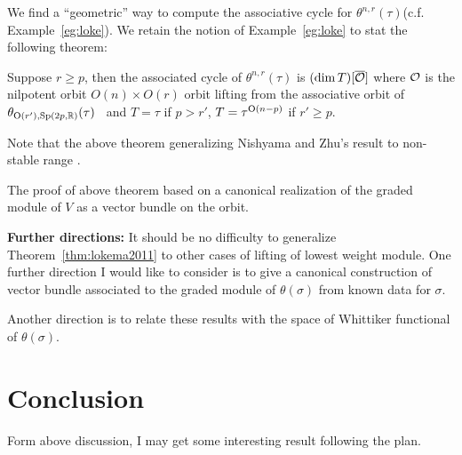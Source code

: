 \documentclass{amsart}
\begin{document}
We find a ``geometric'' way to compute the associative cycle for $\theta^{n,r}(\tau)$(c.f. Example~\ref{eg:loke}).
We retain the notion of Example~\ref{eg:loke} to stat the following theorem:
\begin{thm} \label{thm:lokema2011}
Suppose $r\geq p$, then the associated cycle of $\theta^{n,r}(\tau)$ is 
$(\dim T)[\overline{\mathcal{O}}]$ where $\mathcal{O}$ is the nilpotent orbit $O(n)\times O(r)$ orbit lifting from the associative
orbit of $\theta_{{\rm O}(r'),{\rm Sp}(2p,{\mathbb{R}})}(\tau)$~\cite{NishyamaZhu2004} 
and $T= \tau$ if $p>r'$, $T=\tau^{{\rm O}(n-p)}$ if $r'\geq p$.  
\end{thm}
Note that the above theorem generalizing Nishyama and Zhu's result to non-stable range \cite{NishyamaZhu2004}.

The proof of above theorem based on a canonical realization of the graded module of $V$ as a vector bundle on the orbit. 

{\bf Further directions:} It should be no difficulty to generalize Theorem~\ref{thm:lokema2011}
to other cases of lifting of lowest weight module. One further direction I would like to consider
is to give a canonical construction of vector bundle associated to
the graded module of $\theta(\sigma)$ from known data for $\sigma$.

Another direction is to relate these results with the space of Whittiker functional of $\theta(\sigma)$.

\section{Conclusion}
Form above discussion, I may get some interesting result following the plan.

{}

\end{document}
